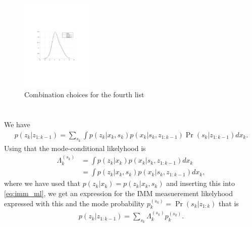 \documentclass[]{article}
\begin{document}
\begin{figure}[H]
\centering
\label{fig:combinations}
\includegraphics[width=0.3\textwidth, trim={8cm, 8cm, 8cm, 8cm, clip}]{matlab/combinations1b.pdf}
\caption{Combination choices for the fourth list}
\end{figure}

\section{}
\subsection{}
We have
\begin{equation}\begin{aligned}
\label{eq:imm_ml}
p(z_k | z_{1:k-1}) = \sum_{s_k}\int p(z_k | x_k, s_k) p(x_k | s_k, z_{1:k-1}) \Pr(s_k | z_{1:k-1})dx_k.
\end{aligned}\end{equation}
Using that the mode-conditional likelyhood is
\begin{equation}\begin{aligned}
\Lambda^{(s_k)}_k &= \int p(z_k | x_k) p(x_k | s_k, z_{1:k-1})dx_k \\
&= \int p(z_k | x_k, s_k) p(x_k | s_k, z_{1:k-1})dx_k,
\end{aligned}\end{equation}
where we have used that $p(z_k | x_k) = p(z_k | x_k, s_k)$ and inserting this into \eqref{eq:imm_ml}, we get an expression for the IMM measuerement likelyhood expressed with this and the mode probability $p_k^{(s_k)} = \Pr(s_k | z_{1:k})$ that is
\begin{equation}\begin{aligned}
p(z_k | z_{1:k-1}) = \sum_{s_k}\Lambda_k^{(s_k)}p_k^{(s_k)}.
\end{aligned}\end{equation}
\end{document}
